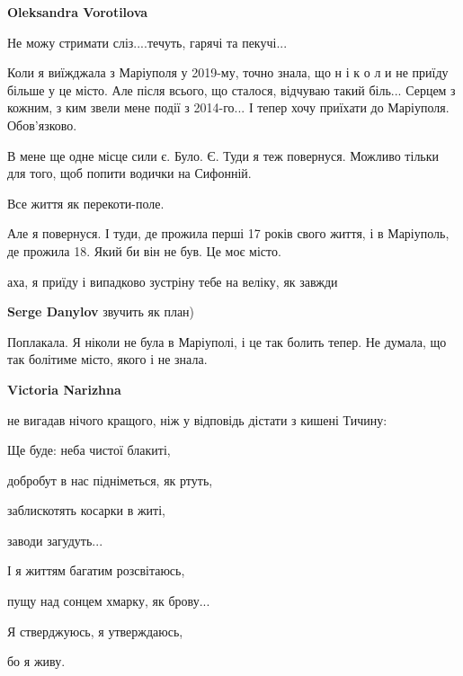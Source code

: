 \textbf{Oleksandra Vorotilova}


Не можу стримати сліз....течуть, гарячі та пекучі...

Коли я виїжджала з Маріуполя у 2019-му, точно знала, що н і к о л и не приїду
більше у це місто. Але після всього, що сталося, відчуваю такий біль... Серцем
з кожним, з ким звели мене події з 2014-го... І тепер хочу приїхати до
Маріуполя. Обов'язково.


В мене ще одне місце сили є. Було. Є. Туди я теж повернуся. Можливо тільки для
того, щоб попити водички на Сифонній.

Все життя як перекоти-поле.

Але я повернуся. І туди, де прожила перші 17 років свого життя, і в Маріуполь,
де прожила 18. Який би він не був. Це моє місто.


аха, я приїду і випадково зустріну тебе на веліку, як завжди

\begin{itemize} %
\textbf{Serge Danylov} звучить як план)
\end{itemize} %


Поплакала. Я ніколи не була в Маріуполі, і це так болить тепер. Не думала, що
так болітиме місто, якого і не знала.

\begin{itemize} %
\textbf{Victoria Narizhna} 

не вигадав нічого кращого, ніж у відповідь дістати з кишені Тичину:\par
Ще буде: неба чистої блакиті,\par
добробут в нас підніметься, як ртуть,\par
заблискотять косарки в житі,\par
заводи загудуть...\par
І я життям багатим розсвітаюсь,\par
пущу над сонцем хмарку, як брову...\par
Я стверджуюсь, я утверждаюсь,\par
бо я живу.\par
\end{itemize} %


